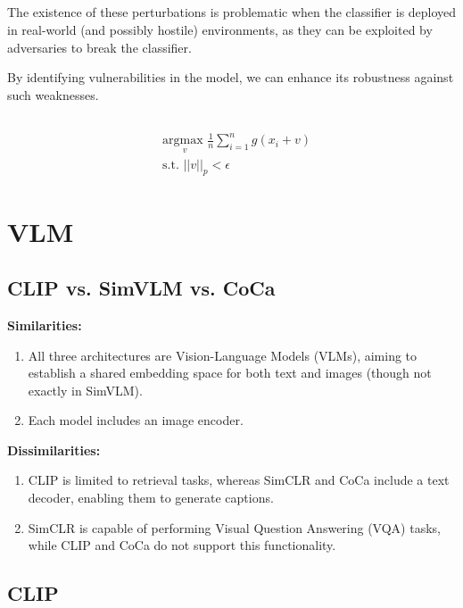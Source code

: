 \documentclass{article}
\begin{document}
\subsection{}
The existence of these perturbations is problematic
when the classifier is deployed in real-world (and possibly hostile)
environments, as they can be exploited by adversaries to break the classifier.

By identifying vulnerabilities in the model,
we can enhance its robustness against such weaknesses.
\subsection{}
\begin{align*}
    &\underset{v}{\text{argmax }} \frac{1}{n} \sum_{i=1}^n g(x_i + v) \\
    &\text{s.t. } ||v||_p < \epsilon
\end{align*}


\section{VLM}

\subsection{CLIP vs. SimVLM vs. CoCa}
\textbf{Similarities:}
\begin{enumerate}
    \item 
    All three architectures are Vision-Language Models (VLMs), 
    aiming to establish a shared embedding space for both text and images (though not exactly in SimVLM).
    \item
    Each model includes an image encoder.
\end{enumerate} 
\newpage
\noindent \textbf{Dissimilarities:}
\begin{enumerate}
    \item 
    CLIP is limited to retrieval tasks, whereas SimCLR and CoCa include a text decoder, enabling them to generate captions.
    \item
    SimCLR is capable of performing Visual Question Answering (VQA) tasks, while CLIP and CoCa do not support this functionality.
\end{enumerate}


\subsection{CLIP}
\end{document}
